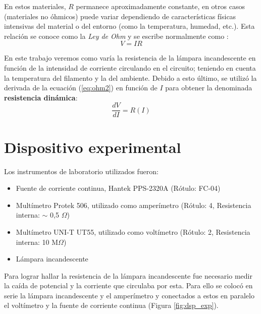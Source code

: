 \documentclass[twoside,twocolumn,a4paper]{article}
\begin{document}
\par En estos materiales, $R$ permanece aproximadamente constante, en otros casos (materiales no \'ohmicos) puede variar dependiendo de caracter\'isticas f\'isicas intensivas del material o del entorno (como la temperatura, humedad, etc.). Esta relaci\'on se conoce como la \textit{Ley de Ohm} y se escribe normalmente como \cite{eq:ohm2}:
\begin{equation}
\label{eq:ohm2}
V = IR
\end{equation}
\par En este trabajo veremos como var\'ia la resistencia de la l\'ampara incandescente en funci\'on de la intensidad de corriente circulando en el circuito; teniendo en cuenta la temperatura del filamento y la del ambiente. Debido a esto \'ultimo, se utiliz\'o la derivada de la ecuaci\'on (\ref{eq:ohm2}) en funci\'on de $I$ para obtener la denominada \textbf{resistencia din\'amica}:
\begin{equation}
\label{eq:resdin}
\frac{dV}{dI}=R(I)
\end{equation}


\section{Dispositivo experimental}

Los instrumentos de laboratorio utilizados fueron:
\begin{itemize}
\item 
\label{Fuente} Fuente de corriente continua, Hantek PPS-2320A (R\'otulo: FC-04)
\cite{Fuente}
\item 
\label{amp} Mult\'imetro Protek 506, utilizado como amper\'imetro (R\'otulo: 4, Resistencia interna: $\sim$ 0,5 $\Omega$)
\cite{amp}
\item 
\label{volt} Mult\'imetro UNI-T UT55, utilizado como volt\'imetro (R\'otulo: 2, Resistencia interna: 10 M$\Omega$)
\cite{volt}
\item L\'ampara incandescente
\end{itemize}

Para lograr hallar la resistencia de la l\'ampara incandescente fue necesario medir la ca\'ida de potencial y la corriente que circulaba por esta. Para ello se coloc\'o en serie la l\'ampara incandescente y el amper\'imetro y conectados a estos en paralelo el volt\'imetro y la fuente de corriente continua (Figura \ref{fig:dsp_exp}).\par
\end{document}
